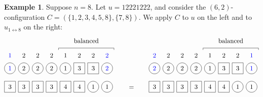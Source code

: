 \documentclass[reqno]{amsart}
\newcommand{\0}{\phantom{c}}
\theoremstyle{plain}
\theoremstyle{definition}
\newtheorem{example}[thm]{Example}
\numberwithin{equation}{section}
\begin{document}
\begin{example}
Suppose $n = 8$.
Let $u = 12221222$, and consider the $(6,2)$-configuration $C = (\{1,2,3,4,5,8\}, \{7,8\})$.
We apply $C$ to $u$ on the left and to $u_{1 \leftrightarrow 8}$ on the right:
\[
\begin{tikzpicture}[baseline=25]
  \def\sc{0.75}   %
  \def\lll{2.7}   %
  \def\ll{2}   %
  \def\l{1}   %
  \node[color=blue] at (1*\sc,\lll) {$1$};
  \node[color=blue] at (8*\sc,\lll) {$2$};
  \foreach \i in {5} { \node at (\i*\sc,\lll){$1$}; }
  \foreach \i in {2,3,4,6,7} { \node at (\i*\sc,\lll){$2$}; }
  \foreach \i in {1,2,3,4,5,8} { \draw (\i*\sc,\ll) circle (0.3); }
  \foreach \i in {6,7} { \draw (\i*\sc-.3,\ll-.3) rectangle +(0.6,+0.6); }
  \node[color=blue] at (1*\sc,\ll) {$1$};
  \node[color=blue] at (8*\sc,\ll) {$2$};
  \foreach \i in {5} { \node at (\i*\sc,\ll) {$1$}; }
  \foreach \i in {2,3,4} { \node at (\i*\sc,\ll) {$2$}; }
  \foreach \i in {6,7} { \node at (\i*\sc,\ll) {$3$}; }
  \foreach \i in {7,8} { \draw (\i*\sc,\l) circle (0.3); }
  \foreach \i in {1,2,3,4,5,6} { \draw (\i*\sc-.3,\l-.3) rectangle +(0.6,+0.6); }
  \foreach \i in {5,6} { \node at (\i*\sc,\l) {$4$}; }
  \foreach \i in {7,8} { \node at (\i*\sc,\l) {$1$}; }
  \foreach \i in {1,2,3,4} { \node at (\i*\sc,\l) {$3$}; }
  \draw (4.5*\sc,3) -- (4.5*\sc,3.1) -- (8.5*\sc,3.1) -- (8.5*\sc,3);
  \node at (6.5*\sc,3.5) {balanced};
\end{tikzpicture}
\hspace{20pt} = \hspace{20pt}
\begin{tikzpicture}[baseline=25]
  \def\sc{0.75}   %
  \def\lll{2.7}   %
  \def\ll{2}   %
  \def\l{1}   %
  \node[color=blue] at (8*\sc,\lll) {$1$};
  \node[color=blue] at (1*\sc,\lll) {$2$};
  \foreach \i in {5} { \node at (\i*\sc,\lll){$1$}; }
  \foreach \i in {2,3,4,6,7} { \node at (\i*\sc,\lll){$2$}; }
  \foreach \i in {1,2,3,4,5,8} { \draw (\i*\sc,\ll) circle (0.3); }
  \foreach \i in {6,7} { \draw (\i*\sc-.3,\ll-.3) rectangle +(0.6,+0.6); }
  \node[color=blue] at (8*\sc,\ll) {$1$};
  \node[color=blue] at (1*\sc,\ll) {$2$};
  \foreach \i in {5} { \node at (\i*\sc,\ll) {$1$}; }
  \foreach \i in {2,3,4} { \node at (\i*\sc,\ll) {$2$}; }
  \foreach \i in {6,7} { \node at (\i*\sc,\ll) {$3$}; }
  \foreach \i in {7,8} { \draw (\i*\sc,\l) circle (0.3); }
  \foreach \i in {1,2,3,4,5,6} { \draw (\i*\sc-.3,\l-.3) rectangle +(0.6,+0.6); }
  \foreach \i in {5,6} { \node at (\i*\sc,\l) {$4$}; }
  \foreach \i in {7,8} { \node at (\i*\sc,\l) {$1$}; }
  \foreach \i in {1,2,3,4} { \node at (\i*\sc,\l) {$3$}; }
  \draw (4.5*\sc,3) -- (4.5*\sc,3.1) -- (8.5*\sc,3.1) -- (8.5*\sc,3);
  \node at (6.5*\sc,3.5) {balanced};
\end{tikzpicture}
\]
\end{example}
\end{document}
